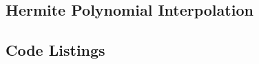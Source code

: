 \documentclass[a4paper,titlepage]{article}
\begin{document}
		\subsection{Hermite Polynomial Interpolation}
	\newpage
	\onecolumn
	\begin{appendices}
		
		\section{Code Listings} \label{appendix:code}
		
		
		\begin{center}
			\inputminted{python}{../polynomial.py}
			\label{lst:poly}
		\end{center}
		\begin{center}
			\inputminted{python}{../interpolation.py}
			\label{lst:interp}
		\end{center}
	\end{appendices}
\end{document}
